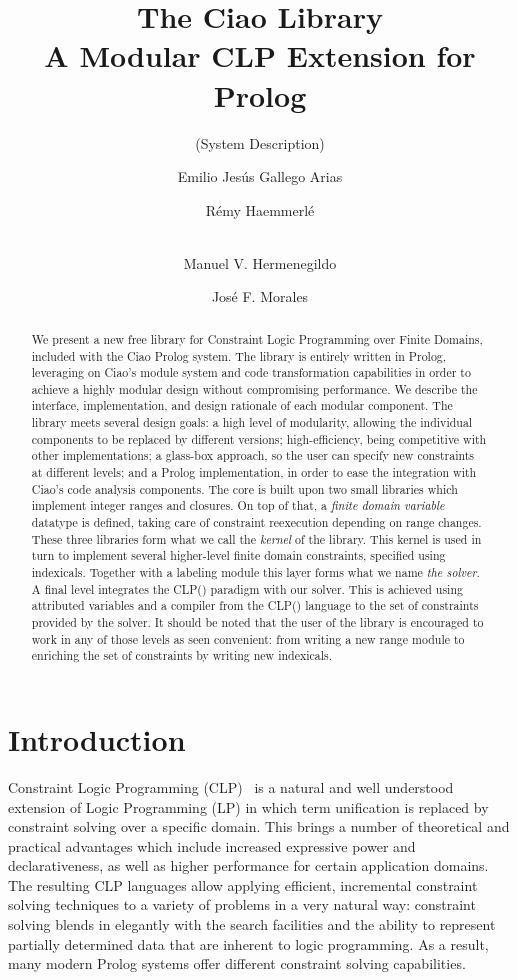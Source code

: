 \documentclass{llncs}
\title{The Ciao \clpfd Library \\ A Modular CLP Extension for Prolog}
\subtitle{(System Description)}
\author{Emilio Jesús Gallego Arias\inst{1} \and Rémy Haemmerlé\inst{1} \and \\ Manuel V. Hermenegildo\inst{1,2} \and José F. Morales\inst{2}}
\institute{Universidad Politécnica de Madrid \and IMDEA Software Institute }
\newcommand{\clpfd}{CLP()\xspace}
\newcommand{\fd}{\xspace}
\begin{document}
\maketitle

\begin{abstract}
  We present a new free library for Constraint Logic Programming over
  Finite Domains, included with the Ciao Prolog system.
The library is entirely written in Prolog, leveraging on Ciao's
  module system and code transformation capabilities in order to
  achieve a highly modular design without compromising performance.
  We describe the interface, implementation, and design rationale of
  each modular component.
The library meets several design goals: a high level of modularity,
  allowing the individual components to be replaced by different
  versions; high-efficiency, being competitive with other \fd
  implementations; a glass-box approach, so the user can specify new
  constraints at different levels; and a Prolog implementation, in order
  to ease the integration with Ciao's code analysis components.
The core is built upon two small libraries which implement integer
  ranges and closures. On top of that, a \emph{finite domain variable}
  datatype is defined, taking care of constraint reexecution depending
  on range changes. These three libraries form what we call the
  \emph{\fd kernel} of the library.
This \fd kernel is used in turn to implement several higher-level
  finite domain constraints, specified using indexicals. Together with
  a labeling module this layer forms what we name \emph{the \fd
    solver}.
A final level integrates the \clpfd paradigm with
  our \fd solver. This is achieved using attributed variables and a
  compiler from the \clpfd language to the set of constraints
  provided by the solver.
It should be noted that the user of the library is encouraged to
  work in any of those levels as seen convenient: from writing a
  new range module to enriching the set of \fd constraints by writing
  new indexicals.
\end{abstract}

\section{Introduction}
\label{sec:introduction}

Constraint Logic Programming (CLP)~\cite{survey94-short} is a natural
and well understood extension of Logic
Programming (LP) in which term unification is replaced by constraint
solving over a specific domain.  This brings a number of theoretical
and practical advantages which include increased expressive power and
declarativeness, as well as higher performance for certain application
domains.  The resulting CLP languages allow applying efficient,
incremental constraint solving techniques to a variety of problems in
a very natural way: constraint solving blends in elegantly with the
search facilities and the ability to represent partially determined
data that are inherent to logic programming.  As a result, many modern
Prolog systems offer different constraint solving capabilities.
\end{document}
